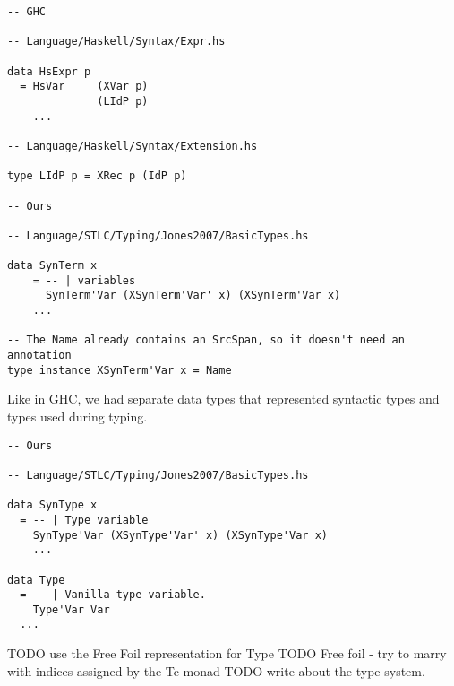 \begin{verbatim}
-- GHC

-- Language/Haskell/Syntax/Expr.hs

data HsExpr p
  = HsVar     (XVar p)
              (LIdP p)
    ...

-- Language/Haskell/Syntax/Extension.hs

type LIdP p = XRec p (IdP p)

-- Ours

-- Language/STLC/Typing/Jones2007/BasicTypes.hs

data SynTerm x
    = -- | variables
      SynTerm'Var (XSynTerm'Var' x) (XSynTerm'Var x)
    ...

-- The Name already contains an SrcSpan, so it doesn't need an annotation
type instance XSynTerm'Var x = Name
\end{verbatim}

Like in GHC, we had separate data types that represented syntactic types and types used during typing.

\begin{verbatim}
-- Ours

-- Language/STLC/Typing/Jones2007/BasicTypes.hs

data SynType x
  = -- | Type variable
    SynType'Var (XSynType'Var' x) (XSynType'Var x)
    ...

data Type
  = -- | Vanilla type variable.
    Type'Var Var
  ...
\end{verbatim}


TODO use the Free Foil representation for Type
TODO Free foil - try to marry with indices assigned by the Tc monad
TODO write about the type system.



